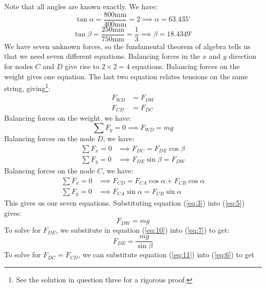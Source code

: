 \documentclass{article}
\begin{document}
Note that all angles are known exactly. We have:
\begin{equation}
    \tan\alpha=\frac{800 \si{\milli\meter}}{400 \si{\milli\meter}}=2\implies \alpha = 63.435^\circ
    \label{eq:1}
\end{equation}
\begin{equation}
    \tan\beta=\frac{250 \si{\milli\meter}}{750 \si{\milli\meter}}=\frac{1}{3} \implies \beta = 18.4349^\circ
    \label{eq:2}
\end{equation}
We have seven unknown forces, so the fundamental theorem of algebra tells us that we need seven different equations. Balancing forces in the $x$ and $y$ direction for nodes $C$ and $D$ give rise to $2\times 2=4$ equations. Balancing forces on the weight gives one equation. The last two equation relates tensions on the same string, giving\footnote{See the solution in question three for a rigorous proof.}:
\begin{align}
    F_{WD}&=F_{DW}\label{eq:3} \\
    F_{CD}&=F_{DC}\label{eq:4}
\end{align}
Balancing forces on the weight, we have:
\begin{equation}
    \sum F_y = 0 \implies \boxed{F_{WD}=mg}
    \label{eq:5}
\end{equation}
Balancing forces on the node $D$, we have:
\begin{align}
    \sum F_x = 0 &\implies F_{DC}=F_{DE}\cos\beta\label{eq:6} \\
    \sum F_y = 0 &\implies F_{DE}\sin\beta=F_{DW}\label{eq:7}
\end{align}
Balancing forces on the node $C$, we have:
\begin{align}
    \sum F_x = 0 &\implies F_{CD}=F_{CA}\cos\alpha+F_{CB}\cos\alpha \label{eq:8}\\
    \sum F_y = 0 &\implies F_{CA}\sin\alpha=F_{CB}\sin\alpha\label{eq:9}
\end{align}
This gives us our seven equations. Substituting equation (\ref{eq:3}) into (\ref{eq:5}) gives:
\begin{equation}
    \boxed{F_{DW}=mg}
    \label{eq:10}
\end{equation}
To solve for $F_{DE}$, we substitute in equation (\ref{eq:10}) into (\ref{eq:7}) to get:
\begin{equation}
    \boxed{F_{DE} = \frac{mg}{\sin\beta}}
    \label{eq:11}
\end{equation}
To solve for $F_{DC}=F_{CD}$, we can substitute equation (\ref{eq:11}) into (\ref{eq:6}) to get
\end{document}

